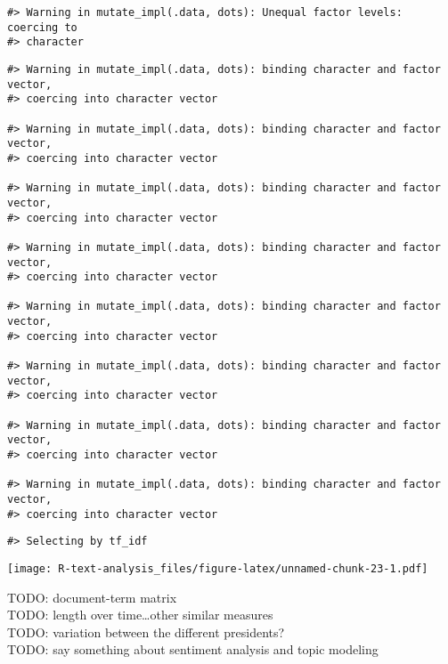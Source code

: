 \documentclass[]{book}
\begin{document}
\begin{verbatim}
#> Warning in mutate_impl(.data, dots): Unequal factor levels: coercing to
#> character
\end{verbatim}

\begin{verbatim}
#> Warning in mutate_impl(.data, dots): binding character and factor vector,
#> coercing into character vector

#> Warning in mutate_impl(.data, dots): binding character and factor vector,
#> coercing into character vector

#> Warning in mutate_impl(.data, dots): binding character and factor vector,
#> coercing into character vector

#> Warning in mutate_impl(.data, dots): binding character and factor vector,
#> coercing into character vector

#> Warning in mutate_impl(.data, dots): binding character and factor vector,
#> coercing into character vector

#> Warning in mutate_impl(.data, dots): binding character and factor vector,
#> coercing into character vector

#> Warning in mutate_impl(.data, dots): binding character and factor vector,
#> coercing into character vector

#> Warning in mutate_impl(.data, dots): binding character and factor vector,
#> coercing into character vector
\end{verbatim}

\begin{verbatim}
#> Selecting by tf_idf
\end{verbatim}

\texttt{[image: R-text-analysis\_files/figure-latex/unnamed-chunk-23-1.pdf]}

TODO: document-term matrix\\
TODO: length over time\ldots other similar measures\\
TODO: variation between the different presidents?\\
TODO: say something about sentiment analysis and topic modeling


\end{document}
